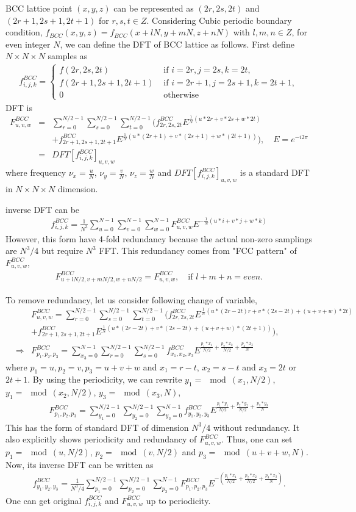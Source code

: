 \documentclass[10pt]{book}
\newcommand{\bea}{\begin{eqnarray}}
\newcommand{\eea}{\end{eqnarray}}
\newcommand{\no}{\nonumber \\}
\begin{document}
BCC lattice point $(x,y,z)$ can be represented as $(2r,2s,2t)$ and $(2r+1,2s+1,2t+1)$
for $r,s,t\in Z$. 
Considering Cubic periodic boundary condition, 
$f_{BCC}(x,y,z)=f_{BCC}(x+l N,y+m N, z+n N)$ with $l,m,n\in Z$, 
for even integer $N$,
we can define the DFT of BCC lattice as follows.
First define $N\times N\times N$ samples as  
\bea 
f_{i,j,k}^{BCC} =\left\{ \begin{array}{cc}
	f(2r,2s,2t)  &\mbox{ if } i=2r,j=2s,k=2t,\\ 
	f(2r+1,2s+1,2t+1) &\mbox{ if } i=2r+1,j=2s+1,k=2t+1,\\ 
	0 &\mbox{ otherwise}
\end{array} \right. 
\eea   
DFT is 
\bea 
F^{BCC}_{u,v,w}&=&\sum_{r=0}^{N/2-1}\sum_{s=0}^{N/2-1}\sum_{t=0}^{N/2-1}
\Big( f^{BCC}_{2r,2s,2t} E^{\frac{1}{N}(u*2r+v*2s+w*2t)}
\no & &
+f^{BCC}_{2r+1,2s+1,2t+1} E^{\frac{1}{N}(u*(2r+1)+v*(2s+1)+w*(2t+1))} \Big),
\quad E=e^{-i2\pi} \no 
&=& DFT[f_{i,j,k}^{BCC}]_{u,v,w}
\eea 
where frequency $\nu_x=\frac{u}{N}$, $\nu_y=\frac{v}{N}$, $\nu_z=\frac{w}{N}$
and $DFT[f_{i,j,k}^{BCC}]_{u,v,w}$ is a standard DFT in $N\times N\times N$ dimension. 

inverse DFT can be
\bea 
f_{i,j,k}^{BCC}=\frac{1}{N^3}\sum_{u=0}^{N-1}\sum_{v=0}^{N-1}\sum_{w=0}^{N-1}
F^{BCC}_{u,v,w} E^{-\frac{1}{N}(u*i+v*j+w*k)}
\eea 
However, this form have 4-fold redundancy because the actual non-zero samplings are
$N^3/4$ but require $N^3$ FFT. This redundancy comes from "FCC pattern" of $F^{BCC}_{u,v,w}$, 
\bea 
F^{BCC}_{u+l N/2,v+m N/2,w+n N/2}=F^{BCC}_{u,v,w}, \quad \mbox{if } l+m+n=even.
\eea 

To remove redundancy, let us consider following change of variable,
\bea 
& &F^{BCC}_{u,v,w}=\sum_{r=0}^{N/2-1}\sum_{s=0}^{N/2-1}\sum_{t=0}^{N/2-1}
( f^{BCC}_{2r,2s,2t} E^{\frac{1}{N}(u*(2r-2t)r+v*(2s-2t)+(u+v+w)*2t)}
\no & &
+f^{BCC}_{2r+1,2s+1,2t+1} E^{\frac{1}{N}(u*(2r-2t)+v*(2s-2t)+(u+v+w)*(2t+1))} ), \no 
&\Rightarrow &F^{BCC}_{p_1,p_2,p_3} = \sum_{x_3=0}^{N-1}\sum_{r=0}^{N/2-1}\sum_{s=0}^{N/2-1}
f^{BCC}_{x_1,x_2,x_3} E^{\frac{p_1*x_1}{N/2}+\frac{p_2*x_2}{N/2}+\frac{p_3*x_3}{N}}
\eea 
where $p_1=u, p_2=v, p_3=u+v+w$ and $x_1=r-t$, $x_2=s-t$ and $x_3=2t$ or $2t+1$. 
By using the periodicity, we can rewrite 
$y_1=\mod(x_1,N/2)$, $y_1=\mod(x_2,N/2)$, $y_3=\mod(x_3,N)$,
\bea 
F^{BCC}_{p_1,p_2,p_3}=\sum_{y_1=0}^{N/2-1}\sum_{y_2=0}^{N/2-1} \sum_{y_3=0}^{N-1}
f^{BCC}_{y_1,y_2,y_3} E^{\frac{p_1*y_1}{N/2}+\frac{p_2*y_2}{N/2}+\frac{p_3*y_3}{N}}           
\eea 
This has the form of standard DFT of dimension $N^3/4$
without redundancy. 
It also explicitly shows periodicity and redundancy of $F^{BCC}_{u,v,w}$. 
Thus, one can set $p_1=\mod(u,N/2)$, $p_2=\mod(v,N/2)$ and $p_3=\mod(u+v+w,N)$.
Now, its inverse DFT can be written as
\bea 
f^{BCC}_{y_1,y_2,y_3}=\frac{1}{N^3/4}\sum_{p_1=0}^{N/2-1} \sum_{p_2=0}^{N/2-1}\sum_{p_3=0}^{N-1}
F^{BCC}_{p_1,p_2,p_3}E^{-(\frac{p_1*x_1}{N/2}+\frac{p_2*x_2}{N/2}+\frac{p_3*x_3}{N})}. 
\eea 
One can get original $f^{BCC}_{i,j,k}$ and $F^{BCC}_{u,v,w}$ up to periodicity.  
\end{document}
